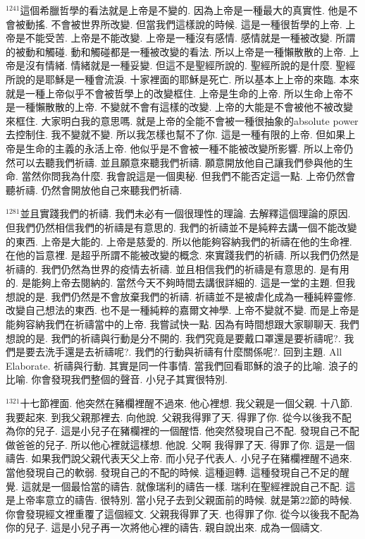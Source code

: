\documentclass{book}
\begin{document}
$^{1241}$這個希臘哲學的看法就是上帝是不變的.
因為上帝是一種最大的真實性.
他是不會被動搖.
不會被世界所改變.
但當我們這樣說的時候.
這是一種很哲學的上帝.
上帝是不能受苦.
上帝是不能改變.
上帝是一種沒有感情.
感情就是一種被改變.
所謂的被動和觸碰.
動和觸碰都是一種被改變的看法.
所以上帝是一種懶散散的上帝.
上帝是沒有情緒.
情緒就是一種妥變.
但這不是聖經所說的.
聖經所說的是什麼.
聖經所說的是耶穌是一種會流淚.
十家裡面的耶穌是死亡.
所以基本上上帝的來臨.
本來就是一種上帝似乎不會被哲學上的改變框住.
上帝是生命的上帝.
所以生命上帝不是一種懶散散的上帝.
不變就不會有這樣的改變.
上帝的大能是不會被他不被改變來框住.
大家明白我的意思嗎.
就是上帝的全能不會被一種很抽象的absolute power去控制住.
我不變就不變.
所以我怎樣也幫不了你.
這是一種有限的上帝.
但如果上帝是生命的主義的永活上帝.
他似乎是不會被一種不能被改變所影響.
所以上帝仍然可以去聽我們祈禱.
並且願意來聽我們祈禱.
願意開放他自己讓我們參與他的生命.
當然你問我為什麼.
我會說這是一個奧秘.
但我們不能否定這一點.
上帝仍然會聽祈禱.
仍然會開放他自己來聽我們祈禱.

$^{1281}$並且實踐我們的祈禱.
我們未必有一個很理性的理論.
去解釋這個理論的原因.
但我們仍然相信我們的祈禱是有意思的.
我們的祈禱並不是純粹去講一個不能改變的東西.
上帝是大能的.
上帝是慈愛的.
所以他能夠容納我們的祈禱在他的生命裡.
在他的旨意裡.
是超乎所謂不能被改變的概念.
來實踐我們的祈禱.
所以我們仍然是祈禱的.
我們仍然為世界的疫情去祈禱.
並且相信我們的祈禱是有意思的.
是有用的.
是能夠上帝去閱納的.
當然今天不夠時間去講很詳細的.
這是一堂的主題.
但我想說的是.
我們仍然是不會放棄我們的祈禱.
祈禱並不是被虐化成為一種純粹靈修.
改變自己想法的東西.
也不是一種純粹的嘉爾文神學.
上帝不變就不變.
而是上帝是能夠容納我們在祈禱當中的上帝.
我嘗試快一點.
因為有時間想跟大家聊聊天.
我們想說的是.
我們的祈禱與行動是分不開的.
我們究竟是要戴口罩還是要祈禱呢?.
我們是要去洗手還是去祈禱呢?.
我們的行動與祈禱有什麼關係呢?.
回到主題.
All Elaborate.
祈禱與行動.
其實是同一件事情.
當我們回看耶穌的浪子的比喻.
浪子的比喻.
你會發現我們整個的聲音.
小兒子其實很特別.

$^{1321}$十七節裡面.
他突然在豬欄裡醒不過來.
他心裡想.
我父親是一個父親.
十八節.
我要起來.
到我父親那裡去.
向他說.
父親我得罪了天.
得罪了你.
從今以後我不配為你的兒子.
這是小兒子在豬欄裡的一個醒悟.
他突然發現自己不配.
發現自己不配做爸爸的兒子.
所以他心裡就這樣想.
他說.
父啊 我得罪了天.
得罪了你.
這是一個禱告.
如果我們說父親代表天父上帝.
而小兒子代表人.
小兒子在豬欄裡醒不過來.
當他發現自己的軟弱.
發現自己的不配的時候.
這種迴轉.
這種發現自己不足的醒覺.
這就是一個最恰當的禱告.
就像瑞利的禱告一樣.
瑞利在聖經裡說自己不配.
這是上帝率意立的禱告.
很特別.
當小兒子去到父親面前的時候.
就是第22節的時候.
你會發現經文裡重覆了這個經文.
父親我得罪了天.
也得罪了你.
從今以後我不配為你的兒子.
這是小兒子再一次將他心裡的禱告.
親自說出來.
成為一個禱文.
\end{document}
